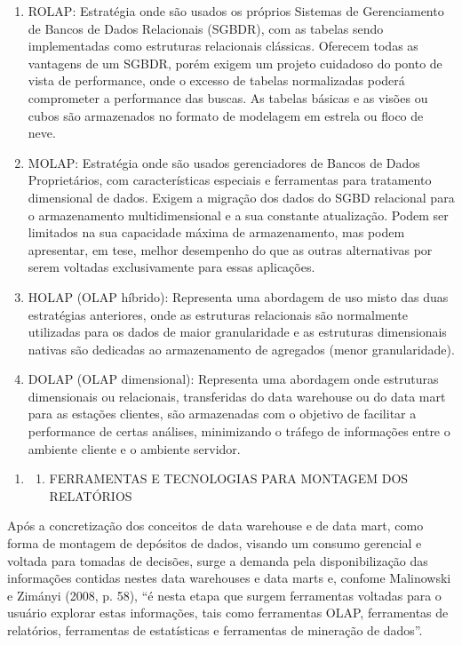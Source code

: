 \documentclass[a4paper]{article}
\newcommand\liststyleWWviiiNumi{%
\renewcommand\theenumi{\arabic{enumi}}
\renewcommand\theenumii{\arabic{enumi}.\arabic{enumii}}
\renewcommand\theenumiii{\arabic{enumi}.\arabic{enumii}.\arabic{enumiii}}
\renewcommand\theenumiv{\arabic{enumi}.\arabic{enumii}.\arabic{enumiii}.\arabic{enumiv}}
\renewcommand\labelenumi{\theenumi}
\renewcommand\labelenumii{\theenumii}
\renewcommand\labelenumiii{\theenumiii}
\renewcommand\labelenumiv{\theenumiv.}
}
\newcommand\liststyleWWviiiNumix{%
\renewcommand\theenumi{\alph{enumi}}
\renewcommand\theenumii{\alph{enumii}}
\renewcommand\theenumiii{\roman{enumiii}}
\renewcommand\theenumiv{\arabic{enumiv}}
\renewcommand\labelenumi{\theenumi)}
\renewcommand\labelenumii{\theenumii.}
\renewcommand\labelenumiii{\theenumiii.}
\renewcommand\labelenumiv{\theenumiv.}
}
\begin{document}
\liststyleWWviiiNumix
\begin{enumerate}
\item {
\textsf{ROLAP: Estrat\'egia onde s\~ao usados os pr\'oprios Sistemas de Gerenciamento de Bancos de Dados Relacionais
(SGBDR), com as tabelas sendo implementadas como estruturas relacionais cl\'assicas. Oferecem todas as vantagens de um
SGBDR, por\'em exigem um projeto cuidadoso do ponto de vista de performance, onde o excesso de tabelas normalizadas
poder\'a comprometer a performance das buscas. As tabelas b\'asicas e as vis\~oes ou cubos s\~ao armazenados no formato
de modelagem em estrela ou floco de neve.}}
\item {\sffamily
MOLAP: Estrat\'egia onde s\~ao usados gerenciadores de Bancos de Dados Propriet\'arios, com caracter\'isticas especiais
e ferramentas para tratamento dimensional de dados. Exigem a migra\c{c}\~ao dos dados do SGBD relacional para o
armazenamento multidimensional e a sua constante atualiza\c{c}\~ao. Podem ser limitados na sua capacidade m\'axima de
armazenamento, mas podem apresentar, em tese, melhor desempenho do que as outras alternativas por serem voltadas
exclusivamente para essas aplica\c{c}\~oes.}
\item {
\textsf{HOLAP (OLAP h\'ibrido): Representa uma abordagem de uso misto das duas estrat\'egias anteriores, onde as
estruturas relacionais s\~ao normalmente utilizadas para os dados de maior granularidade e as estruturas dimensionais
nativas s\~ao dedicadas ao armazenamento de agregados (menor granularidade).}}
\item {
\textsf{DOLAP (OLAP dimensional): Representa uma abordagem onde estruturas dimensionais ou relacionais, transferidas do
data warehouse ou do data mart para as esta\c{c}\~oes clientes, s\~ao armazenadas com o objetivo de facilitar a
performance de certas an\'alises, minimizando o tr\'afego de informa\c{c}\~oes entre o ambiente cliente e o ambiente
servidor.}}
\end{enumerate}

\bigskip

\liststyleWWviiiNumi
\begin{enumerate}
\item \begin{enumerate}
\item {\sffamily
FERRAMENTAS E TECNOLOGIAS PARA MONTAGEM DOS RELAT\'ORIOS}
\end{enumerate}
\end{enumerate}
{
\textsf{Ap\'os a concretiza\c{c}\~ao dos conceitos de data warehouse e de data mart, como forma de montagem de
dep\'ositos de dados, visando um consumo gerencial e voltada para tomadas de decis\~oes, surge a demanda pela
disponibiliza\c{c}\~ao das informa\c{c}\~oes contidas nestes data warehouses e data marts e, confome Malinowski e
Zim\'anyi (2008, p. 58), ``\'e nesta etapa que surgem ferramentas voltadas para o usu\'ario explorar estas
informa\c{c}\~oes, tais como ferramentas OLAP, ferramentas de relat\'orios, ferramentas de estat\'isticas e ferramentas
de minera\c{c}\~ao de dados''.}}
\end{document}
